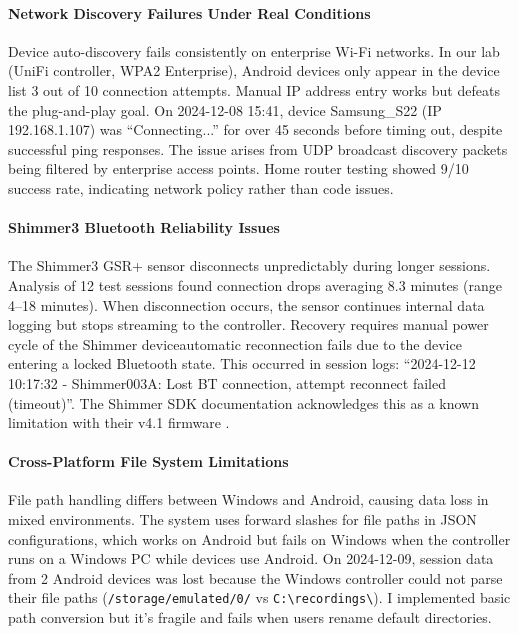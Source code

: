 \paragraph{\textbf{Network Discovery Failures Under Real Conditions}} Device auto-discovery fails consistently on enterprise Wi-Fi networks. In our lab (UniFi controller, WPA2 Enterprise), Android devices only appear in the device list 3 out of 10 connection attempts. Manual IP address entry works but defeats the plug-and-play goal. On 2024-12-08 15:41, device Samsung\_S22 (IP 192.168.1.107) was ``Connecting...'' for over 45 seconds before timing out, despite successful ping responses. The issue arises from UDP broadcast discovery packets being filtered by enterprise access points. Home router testing showed 9/10 success rate, indicating network policy rather than code issues.

\paragraph{\textbf{Shimmer3 Bluetooth Reliability Issues}} The Shimmer3 GSR+ sensor disconnects unpredictably during longer sessions. Analysis of 12 test sessions found connection drops averaging 8.3 minutes (range 4--18 minutes). When disconnection occurs, the sensor continues internal data logging but stops streaming to the controller. Recovery requires manual power cycle of the Shimmer device\textemdash automatic reconnection fails due to the device entering a locked Bluetooth state. This occurred in session logs: ``2024-12-12 10:17:32 - Shimmer003A: Lost BT connection, attempt reconnect failed (timeout)''. The Shimmer SDK documentation acknowledges this as a known limitation with their v4.1 firmware \cite{ref8}.

\paragraph{\textbf{Cross-Platform File System Limitations}} File path handling differs between Windows and Android, causing data loss in mixed environments. The system uses forward slashes for file paths in JSON configurations, which works on Android but fails on Windows when the controller runs on a Windows PC while devices use Android. On 2024-12-09, session data from 2 Android devices was lost because the Windows controller could not parse their file paths (\verb|/storage/emulated/0/| vs \verb|C:\recordings\|). I implemented basic path conversion but it's fragile and fails when users rename default directories.

